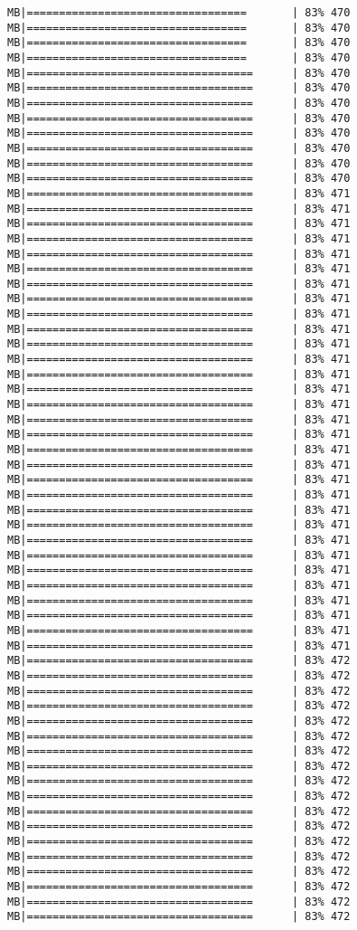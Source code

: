 \documentclass[
]{article}
\begin{document}
\begin{verbatim}
MB|==================================       | 83% 470 MB|==================================       | 83% 470 MB|==================================       | 83% 470 MB|==================================       | 83% 470 MB|===================================      | 83% 470 MB|===================================      | 83% 470 MB|===================================      | 83% 470 MB|===================================      | 83% 470 MB|===================================      | 83% 470 MB|===================================      | 83% 470 MB|===================================      | 83% 470 MB|===================================      | 83% 470 MB|===================================      | 83% 471 MB|===================================      | 83% 471 MB|===================================      | 83% 471 MB|===================================      | 83% 471 MB|===================================      | 83% 471 MB|===================================      | 83% 471 MB|===================================      | 83% 471 MB|===================================      | 83% 471 MB|===================================      | 83% 471 MB|===================================      | 83% 471 MB|===================================      | 83% 471 MB|===================================      | 83% 471 MB|===================================      | 83% 471 MB|===================================      | 83% 471 MB|===================================      | 83% 471 MB|===================================      | 83% 471 MB|===================================      | 83% 471 MB|===================================      | 83% 471 MB|===================================      | 83% 471 MB|===================================      | 83% 471 MB|===================================      | 83% 471 MB|===================================      | 83% 471 MB|===================================      | 83% 471 MB|===================================      | 83% 471 MB|===================================      | 83% 471 MB|===================================      | 83% 471 MB|===================================      | 83% 471 MB|===================================      | 83% 471 MB|===================================      | 83% 471 MB|===================================      | 83% 471 MB|===================================      | 83% 471 MB|===================================      | 83% 472 MB|===================================      | 83% 472 MB|===================================      | 83% 472 MB|===================================      | 83% 472 MB|===================================      | 83% 472 MB|===================================      | 83% 472 MB|===================================      | 83% 472 MB|===================================      | 83% 472 MB|===================================      | 83% 472 MB|===================================      | 83% 472 MB|===================================      | 83% 472 MB|===================================      | 83% 472 MB|===================================      | 83% 472 MB|===================================      | 83% 472 MB|===================================      | 83% 472 MB|===================================      | 83% 472 MB|===================================      | 83% 472 MB|===================================      | 83% 472 
\end{verbatim}
\end{document}
